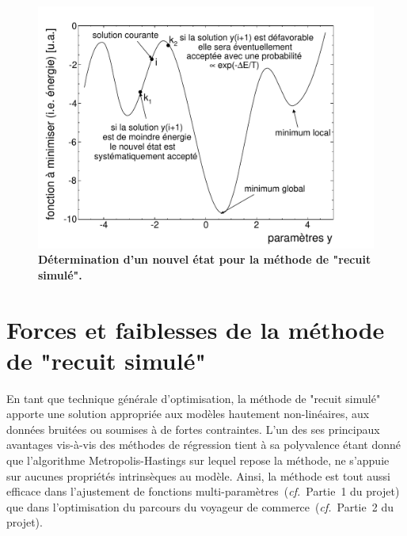\documentclass[10pt,a4paper,twoside]{report}
\begin{document}
\begin{figure}
  \centering
  \includegraphics[scale=0.7]{./plot/PrincipleSAM}
  \caption{\textbf{Détermination d'un nouvel état pour la méthode de
      "recuit simulé".}}
  \label{fig:SAMPrinciple}
\end{figure}

\section{Forces et faiblesses de la méthode de "recuit simulé"}

En tant que technique générale d'optimisation, la méthode de "recuit
simulé" apporte une solution appropriée aux modèles hautement
non-linéaires, aux données bruitées ou soumises à de fortes
contraintes. L'un des ses principaux avantages vis-à-vis des méthodes
de régression tient à sa polyvalence étant donné que l'algorithme
Metropolis-Hastings sur lequel repose la méthode, ne s'appuie sur
aucunes propriétés intrinsèques au modèle. Ainsi, la méthode est tout
aussi efficace dans l'ajustement de fonctions
multi-paramètres~(\emph{cf.}~Partie~1 du projet) que dans
l'optimisation du parcours du voyageur de
commerce~(\emph{cf.}~Partie~2 du projet).
\end{document}
